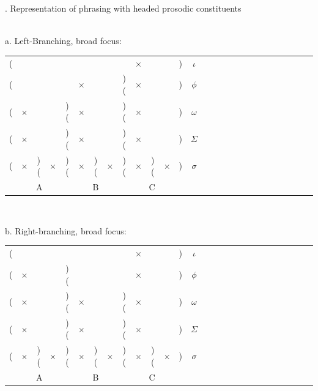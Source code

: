 \documentclass[preprint,review,12pt,authoryear,times]{elsarticle}
\newcommand{\g}{$\times$}
\begin{document}
\ex. Representation of phrasing with headed prosodic constituents\\\label{phrasingrep}
\vspace{-10pt}
\ \\
\parbox{2in}{\footnotesize a. Left-Branching, broad focus:\\
\vspace{-12pt}
\setlength{\unitlength}{1cm}
\setlength\extrarowheight{-3pt}
\begin{tabular}{ccccccccccccccccccccccccccc}
(&&&&&&&&&\g&&&)&\em $\iota$\\
(&&&&&\g&&&)(&\g&&&)&$\phi$\\
(&\g&&&)(&\g&&&)(&\g&&&)&$\omega$\\
(&\g&&&)(&\g&&&)(&\g&&&)&$\Sigma$\\
(&\g&)(&\g&)(&\g&)(&\g&)(&\g&)(&\g&)&$\sigma$\\
\multicolumn{5}{c}{A}&\multicolumn{3}{c}{B}&\multicolumn{5}{c}{C}\\
\end{tabular}
 }
 \vspace{10pt}
  \ \\
\parbox{2in}{\footnotesize b. Right-branching, broad focus:\\
\vspace{-12pt}
\setlength{\unitlength}{1cm}
\setlength\extrarowheight{-3pt}
\begin{tabular}{ccccccccccccccccccccccccccc}
(&&&&&&&&&\g&&&)&\em $\iota$\\
(&\g&&&)(&&&&&\g&&&)&$\phi$\\
(&\g&&&)(&\g&&&)(&\g&&&)&$\omega$\\
(&\g&&&)(&\g&&&)(&\g&&&)&$\Sigma$\\
(&\g&)(&\g&)(&\g&)(&\g&)(&\g&)(&\g&)&$\sigma$\\
\multicolumn{5}{c}{A}&\multicolumn{3}{c}{B}&\multicolumn{5}{c}{C}\\
\end{tabular}
}\label{ferywide}

\end{document}
